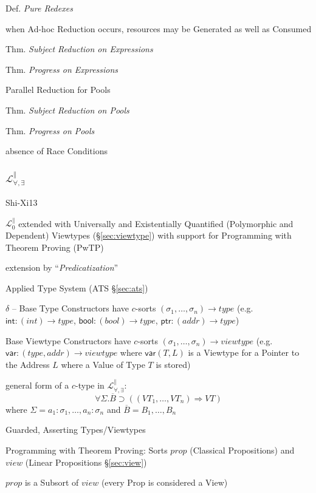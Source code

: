 Def. \emph{Pure Redexes}

when Ad-hoc Reduction occurs, resources may be Generated as well as
Consumed

Thm. \emph{Subject Reduction on Expressions}

Thm. \emph{Progress on Expressions}

Parallel Reduction for Pools

Thm. \emph{Subject Reduction on Pools}

Thm. \emph{Progress on Pools}

absence of Race Conditions



\subsubsection{$\mathcal{L}^\parallel_{\forall,\exists}$}
\label{sec:l_par_quant}

Shi-Xi13

$\mathcal{L}^\parallel_0$ extended with Universally and Existentially
Quantified (Polymorphic and Dependent) Viewtypes
(\S\ref{sec:viewtype}) with support for Programming with Theorem
Proving (PwTP)

extension by ``\emph{Predicatization}''

Applied Type System (ATS \S\ref{sec:ats})

$\delta$ -- Base Type Constructors have $c$-sorts $(\sigma_1, \ldots,
\sigma_n) \rightarrow type$ (e.g. $\mathsf{int} : (int) \rightarrow
type$, $\mathsf{bool} : (bool) \rightarrow type$, $\mathsf{ptr} :
(addr) \rightarrow type$)

Base Viewtype Constructors have $c$-sorts $(\sigma_1, \ldots,
\sigma_n) \rightarrow viewtype$ (e.g. $\mathsf{var} : (type, addr)
\rightarrow viewtype$ where $\mathsf{var}(T,L)$ is a Viewtype for a
Pointer to the Address $L$ where a Value of Type $T$ is stored)

general form of a $c$-type in $\mathcal{L}^\parallel_{\forall,
  \exists}$:
\[
  \forall\Sigma.\overline{B}
    \supset ((VT_1, \ldots, VT_n) \Rightarrow VT)
\]
where $\Sigma = a_1 : \sigma_1, \ldots, a_n : \sigma_n$ and
$\overline{B} = B_1, \ldots, B_n$

Guarded, Asserting Types/Viewtypes %

Programming with Theorem Proving: Sorts $prop$ (Classical
Propositions) and $view$ (Linear Propositions \S\ref{sec:view})

$prop$ is a Subsort of $view$ (every Prop is considered a View)

